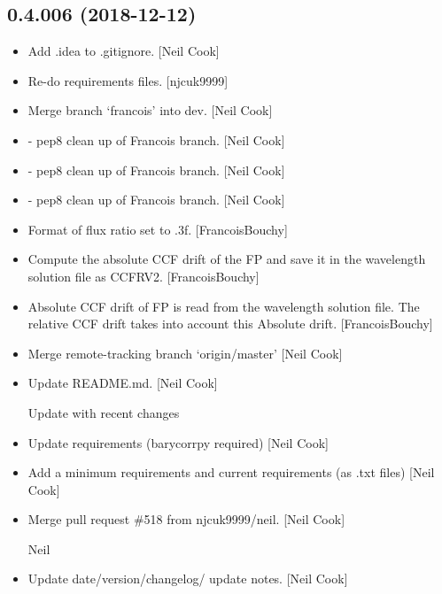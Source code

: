 \documentclass[a4paper,10pt,english]{report}
\begin{document}
\subsection{0.4.006 (2018-12-12)}
\label{\detokenize{misc/changelog:id237}}\begin{itemize}
\item {} 
Add .idea to .gitignore. {[}Neil Cook{]}

\item {} 
Re-do requirements files. {[}njcuk9999{]}

\item {} 
Merge branch ‘francois’ into dev. {[}Neil Cook{]}

\item {} 
 - pep8 clean up of Francois branch. {[}Neil
Cook{]}

\item {} 
 - pep8 clean up of Francois branch. {[}Neil
Cook{]}

\item {} 
 - pep8 clean up of Francois branch. {[}Neil
Cook{]}

\item {} 
Format of flux ratio set to .3f. {[}FrancoisBouchy{]}

\item {} 
Compute the absolute CCF drift of the FP and save it in the wavelength
solution file as CCFRV2. {[}FrancoisBouchy{]}

\item {} 
Absolute CCF drift of FP is read from the wavelength solution file.
The relative CCF drift takes into account this Absolute drift.
{[}FrancoisBouchy{]}

\item {} 
Merge remote-tracking branch ‘origin/master’ {[}Neil Cook{]}

\item {} 
Update README.md. {[}Neil Cook{]}

Update with recent changes

\item {} 
Update requirements (barycorrpy required) {[}Neil Cook{]}

\item {} 
Add a minimum requirements and current requirements (as .txt files)
{[}Neil Cook{]}

\item {} 
Merge pull request \#518 from njcuk9999/neil. {[}Neil Cook{]}

Neil

\item {} 
Update date/version/changelog/ update notes. {[}Neil Cook{]}

\end{itemize}
\end{document}

